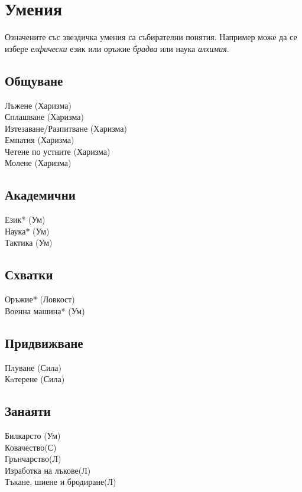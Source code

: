 
\section{Умения}
Означените със звездичка умения са събирателни понятия.
Например може да се избере \textit{елфически} език или оръжие \textit{брадва} или наука \textit{алхимия}.
\subsection{Общуване}
Лъжене (Харизма)                  \\
Сплашване (Харизма)               \\
Изтезаване/Разпитване (Харизма)   \\
Емпатия (Харизма)                 \\
Четене по устните (Харизма)       \\
Молене (Харизма)                  \\

\subsection{Академични}
Език* (Ум)                        \\
Наука* (Ум)                       \\
Тактика (Ум)                      \\

\subsection{Схватки}
Оръжие* (Ловкост)                 \\
Военна машина* (Ум)               \\

\subsection{Придвижване}
Плуване (Сила)                    \\
Кaтерене (Сила)                   \\

\subsection{Занаяти}
Билкарсто (Ум)                    \\
Ковачество(С)                     \\
Грънчарство(Л)                    \\
Изработка на лъкове(Л)            \\
Тъкане, шиене и бродиране(Л)      \\

